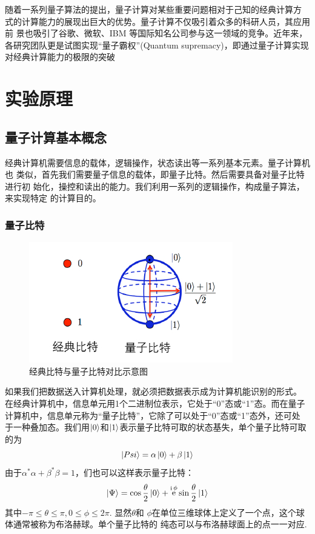 \documentclass[a4paper]{article}
\DeclareMathOperator{\e}{\mathrm{e}}
\DeclareMathOperator{\I}{\mathrm{i}}
\begin{document}
随着一系列量子算法的提出，量子计算对某些重要问题相对于己知的经典计算方
式的计算能力的展现出巨大的优势。量子计算不仅吸引着众多的科研人员，其应用前
景也吸引了谷歌、微软、IBM 等国际知名公司参与这一领域的竞争。近年来，各研究团队更是试图实现“量子霸权”(Quantum supremacy)，即通过量子计算实现对经典计算能力的极限的突破

\section{实验原理}
\subsection{量子计算基本概念}
经典计算机需要信息的载体，逻辑操作，状态读出等一系列基本元素。量子计算机也
类似，首先我们需要量子信息的载体，即量子比特。然后需要具备对量子比特进行初
始化，操控和读出的能力。我们利用一系列的逻辑操作，构成量子算法，来实现特定
的计算目的。
\subsubsection{量子比特}
\begin{figure}[H]
	\centering
	\includegraphics[width=0.4\linewidth]{fig/1.jpg}
	\caption{经典比特与量子比特对比示意图}
\end{figure}
如果我们把数据送入计算机处理，就必须把数据表示成为计算机能识别的形式。
在经典计算机中，信息单元用1个二进制位表示，它处于“0”态或“1”态。而在量子
计算机中，信息单元称为“量子比特”，它除了可以处于“0”态或“1”态外，还可处
于一种叠加态。我们用$ \ket{0} $和$ \ket{1} $表示量子比特可取的状态基失，单个量子比特可取的为
\begin{equation}\label{key}
\ket{Psi} = \alpha\ket{0} + \beta\ket{1}
\end{equation}
由于$ \alpha^*\alpha + \beta^*\beta = 1 $，们也可以这样表示量子比特：
\begin{equation}\label{key}
\ket{\Psi} = \cos\dfrac{\theta}{2}\ket{0} + \e^{\I\phi}\sin\dfrac{\theta}{2}\ket{1}
\end{equation}
其中$ -\pi \leq \theta \leq \pi, 0\leq \phi \leq 2\pi $. 显然$ \theta $和
$ \phi $在单位三维球体上定义了一个点，这个球体通常被称为布洛赫球。单个量子比特的
纯态可以与布洛赫球面上的点一一对应.
\end{document}
